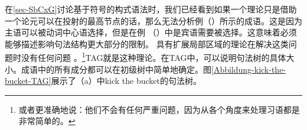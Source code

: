 在\ref{sec-SbCxG}讨论基于符号的构式语法时，我们已经看到如果一个理论只是借助一个论元可以在投射的最高节点的话，那么无法分析例（）所示的成语。这是因为主语可以被动词中心语选择，但是在例 （）中是宾语需要被选择。这意味着必须能够描述影响句法结构更大部分的限制。
\eal
{}
\zl
具有扩展局部区域的理论在解决这类问题时没有任何问题 。\footnote{
或者更准确地说：他们不会有任何严重问题，因为从各个角度来处理习语都是非常简单的\citep{Sailer2000a}。
}TAG就是这种理论。在TAG中，可以说明句法树的具体大小\citep{Abeille88a,AS89a}。成语中的所有成分都可以在初级树中简单地确定。图\vref{Abbildung-kick-the-bucket-TAG}展示了（a）中kick the bucket的句法树。
